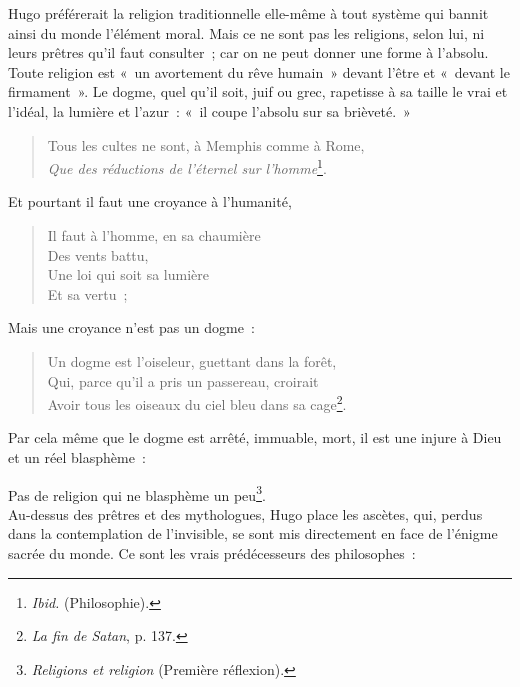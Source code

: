 \documentclass[french,twoside]{book} %
\begin{document}
\noindent Hugo préférerait la religion traditionnelle elle-même à tout système qui bannit ainsi du monde l’élément moral. Mais ce ne sont pas les religions, selon lui, ni leurs prêtres qu’il faut consulter ; car on ne peut donner une forme à l’absolu. Toute religion est « un avortement du rêve humain » devant l’être et « devant le firmament ». Le dogme, quel qu’il soit, juif ou grec, rapetisse à sa taille le vrai et l’idéal, la lumière et l’azur : « il coupe l’absolu sur sa brièveté. »\par


\begin{verse}
Tous les cultes ne sont, à Memphis comme à Rome,\\
\emph{Que des réductions de l’éternel sur l’homme}\footnote{\emph{Ibid.} (Philosophie).}.\\
\end{verse}

\noindent Et pourtant il faut une croyance à l’humanité,\par


\begin{verse}
Il faut à l’homme, en sa chaumière\\
Des vents battu,\\
Une loi qui soit sa lumière\\
Et sa vertu ;\\
\end{verse}

\noindent Mais une croyance n’est pas un dogme :\par


\begin{verse}
Un dogme est l’oiseleur, guettant dans la forêt,\\
Qui, parce qu’il a pris un passereau, croirait\\
Avoir tous les oiseaux du ciel bleu dans sa cage\footnote{\emph{La fin de Satan}, p. 137.}.\\
\end{verse}

\noindent Par cela même que le dogme est arrêté, immuable, mort, il est une injure à Dieu et un réel blasphème :\par

Pas de religion qui ne blasphème un peu\footnote{\emph{Religions et religion} (Première réflexion).}.\\

\noindent Au-dessus des prêtres et des mythologues, Hugo place les ascètes, qui, perdus dans la contemplation de l’invisible, se sont mis directement en face de l’énigme sacrée du monde. Ce sont les vrais prédécesseurs des philosophes :\par
\end{document}
